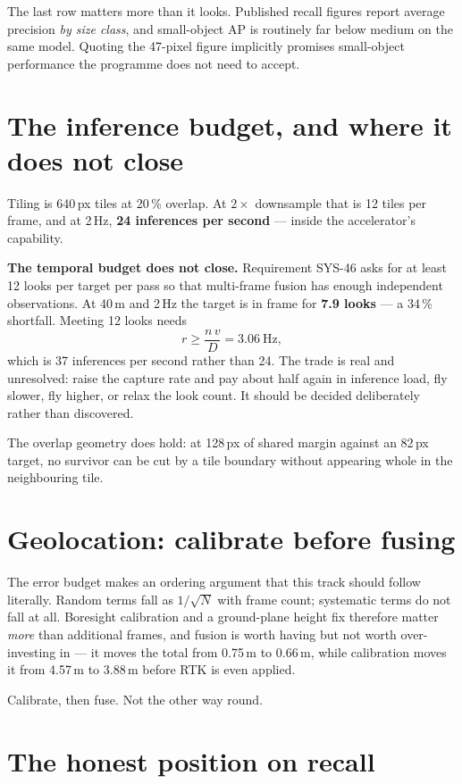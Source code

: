 \documentclass[11pt,a4paper]{article}
\begin{document}
The last row matters more than it looks. Published recall figures report average
precision \emph{by size class}, and small-object AP is routinely far below
medium on the same model. Quoting the 47-pixel figure implicitly promises
small-object performance the programme does not need to accept.

\section{The inference budget, and where it does not close}

Tiling is 640\,px tiles at 20\,\% overlap. At $2\times$ downsample that is 12
tiles per frame, and at 2\,Hz, \textbf{24 inferences per second} --- inside the
accelerator's capability.

\textbf{The temporal budget does not close.} Requirement SYS-46 asks for at
least 12 looks per target per pass so that multi-frame fusion has enough
independent observations. At 40\,m and 2\,Hz the target is in frame for
\textbf{7.9 looks} --- a 34\,\% shortfall. Meeting 12 looks needs
\[
r \geq \frac{n\,v}{D} = 3.06~\text{Hz},
\]
which is 37 inferences per second rather than 24. The trade is real and
unresolved: raise the capture rate and pay about half again in inference load,
fly slower, fly higher, or relax the look count. It should be decided
deliberately rather than discovered.

The overlap geometry does hold: at 128\,px of shared margin against an 82\,px
target, no survivor can be cut by a tile boundary without appearing whole in the
neighbouring tile.

\section{Geolocation: calibrate before fusing}

The error budget makes an ordering argument that this track should follow
literally. Random terms fall as $1/\sqrt{N}$ with frame count; systematic terms
do not fall at all. Boresight calibration and a ground-plane height fix
therefore matter \emph{more} than additional frames, and fusion is worth having
but not worth over-investing in --- it moves the total from 0.75\,m to 0.66\,m,
while calibration moves it from 4.57\,m to 3.88\,m before RTK is even applied.

Calibrate, then fuse. Not the other way round.

\section{The honest position on recall}
\end{document}
